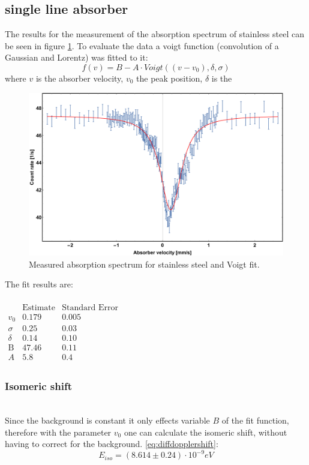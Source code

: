\subsection{single line absorber}
The results for the measurement of the absorption spectrum of stainless steel can be seen in figure \ref{fig:single line absorber:fitresult}. To evaluate the data a voigt function (convolution of a Gaussian and Lorentz) was fitted to it:
\begin{equation}
f(v)=B- A \cdot Voigt((v-v_0),\delta,\sigma )
\end{equation}
where $v$ is the absorber velocity, $v_0$ the peak position, $\delta$ is the 
\begin{figure}[H]
\centering
\includegraphics[width=1.0\linewidth]{../results/steel/voigtfittry.pdf}
\caption[Stainless steel spectrum]{Measured absorption spectrum for stainless steel and Voigt fit.}
\label{fig:single line absorber:fitresult}
\end{figure}
The fit results are:\\ \ \\
$\begin{array}{l|llll}
\text{} & \text{Estimate} & \text{Standard Error} \\
\hline
v_0 & 0.179 & 0.005\\
\sigma  & 0.25 & 0.03 \\
\delta  & 0.14 & 0.10\\
\text{B} & 47.46 & 0.11\\
A & 5.8 & 0.4 &\\
\end{array}$

\subsubsection{Isomeric shift} \ \\
Since the background is constant it only effects variable $B$ of the fit function, therefore
with the parameter $v_0$ one can calculate the isomeric shift, without having to correct for the background. \ref{eq:diffdopplershift}:
\begin{equation}
E_{iso} = (8.614\pm0.24)\cdot 10^{-9} eV
\end{equation}
